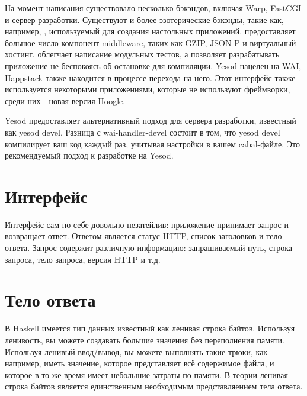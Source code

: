 На момент написания существовало несколько бэкэндов, включая Warp, FastCGI и
сервер разработки. Существуют и более эзотерические бэкэнды, такие как, например,
,
используемый для создания настольных приложений.  предоставляет большое число компонент middleware, таких как  GZIP, JSON-P
и виртуальный хостинг. 
облегчает написание модульных тестов, а  позволяет разрабатывать приложение не беспокоясь об остановке для компиляции.
Yesod нацелен на WAI, Happstack также находится в процессе перехода на него.
Этот интерфейс также используется некоторыми приложениями, которые не используют фреймворки, среди
них - новая версия Hoogle.

\begin{remark}
Yesod предоставляет альтернативный подход для сервера разработки, известный как
yesod devel. Разница с wai-handler-devel состоит в том, что yesod devel компилирует
ваш код каждый раз, учитывая настройки в вашем cabal-файле.
Это рекомендуемый подход к разработке на Yesod.
\end{remark}

\section {Интерфейс}

Интерфейс сам по себе довольно незатейлив: приложение принимает запрос и возвращает
ответ. Ответом является статус HTTP, список заголовков и тело ответа.
Запрос содержит различную информацию: запрашиваемый путь, строка запроса, тело запроса,
версия HTTP и т.д.

\section {Тело ответа}

В Haskell имеется тип данных известный как ленивая строка байтов. Используя ленивость,
вы можете создавать большие значения без переполнения памяти. Используя ленивый ввод/вывод,
вы можете выполнять такие трюки, как например, иметь значение, которое представляет всё 
содержимое файла, и которое в то же время имеет небольшие затраты по памяти. В теории
ленивая строка байтов является единственным необходимым представляением тела ответа.

